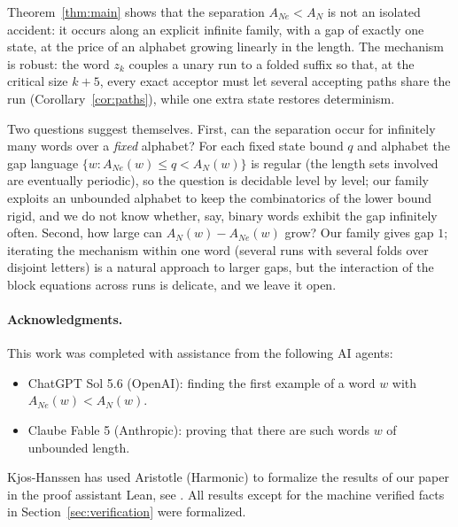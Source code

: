 \documentclass[11pt]{article}
\theoremstyle{definition}
\newcommand{\AN}{A_N}
\newcommand{\ANe}{A_{Ne}}
\begin{document}
Theorem~\ref{thm:main} shows that the separation $\ANe<\AN$ is not an
isolated accident: it occurs along an explicit infinite family, with a gap
of exactly one state, at the price of an alphabet growing linearly in the
length. The mechanism is robust: the word $z_k$ couples a unary run to a
folded suffix so that, at the critical size $k+5$, every exact acceptor
must let several accepting paths share the run (Corollary~\ref{cor:paths}),
while one extra state restores determinism.

Two questions suggest themselves. First, can the separation occur for
infinitely many words over a \emph{fixed} alphabet? For each fixed state
bound $q$ and alphabet the gap language $\{w:\ANe(w)\le q<\AN(w)\}$ is
regular (the length sets involved are eventually periodic), so the question
is decidable level by level; our family exploits an unbounded alphabet to
keep the combinatorics of the lower bound rigid, and we do not know
whether, say, binary words exhibit the gap infinitely often. Second, how
large can $\AN(w)-\ANe(w)$ grow? Our family gives gap $1$; iterating the
mechanism within one word (several runs with several folds over disjoint
letters) is a natural approach to larger gaps, but the interaction of the
block equations across runs is delicate, and we leave it open.

\paragraph{Acknowledgments.}
This work was completed with assistance from the following AI agents:
\begin{itemize}
	\item ChatGPT Sol 5.6 (OpenAI): finding the first example of a word $w$ with $A_{Ne}(w)<A_N(w)$.
	\item Claube Fable 5 (Anthropic): proving that there are such words $w$ of unbounded length.
\end{itemize}
Kjos-Hanssen has used Aristotle (Harmonic) to formalize the results of our paper in the proof assistant Lean, see \cite{pathvsword}.
All results except for the machine verified facts in Section~\ref{sec:verification} were formalized.

\end{document}
